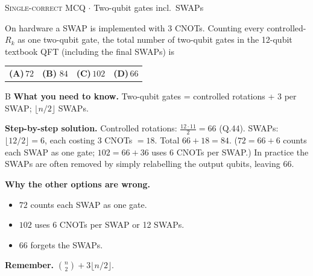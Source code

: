 \documentclass[11pt,a4paper]{article}
\newcommand{\optlabel}[1]{\textbf{(#1)}}
\newcommand{\correctlabel}[1]{\textcolor{okgreen}{\textbf{(#1)}\,\ding{51}}}
\newenvironment{qitem}[1]{\begin{list}{}{\setlength{\leftmargin}{3.3em}\setlength{\labelwidth}{3.1em}%
  \setlength{\labelsep}{0.2em}\setlength{\topsep}{3pt}\setlength{\parsep}{3pt}}\item[\textbf{Q.#1}\hfill]}{\end{list}}
\newcommand{\qsep}{\par\vspace{2pt}{\color{black!15}\hrule}\vspace{4pt}}
\newcommand{\qmeta}[2]{{\footnotesize\color{black!60}\textsc{#1} \;$\cdot$\; #2}\par}
\begin{document}
\begin{qitem}{45}
\qmeta{Single-correct MCQ}{Two-qubit gates incl.\ SWAPs}
On hardware a SWAP is implemented with 3 CNOTs. Counting every controlled-$R_k$ as one two-qubit gate, the total number
of two-qubit gates in the 12-qubit textbook QFT (including the final SWAPs) is
\par\smallskip\noindent\begin{tabularx}{\linewidth}{@{}*{4}{L}@{}}
\optlabel{A}\,$72$ & \correctlabel{B}\,$84$ & \optlabel{C}\,$102$ & \optlabel{D}\,$66$
\end{tabularx}
\end{qitem}
\begin{solbox}{B}
\textbf{\color{brand}What you need to know.} Two-qubit gates = controlled rotations + 3 per SWAP; $\lfloor n/2\rfloor$ SWAPs.

\textbf{\color{brand}Step-by-step solution.} Controlled rotations: $\frac{12\cdot11}{2} = 66$ (Q.44). SWAPs: $\lfloor 12/2\rfloor = 6$, each costing 3 CNOTs $= 18$.
Total $66 + 18 = 84$. ($72 = 66 + 6$ counts each SWAP as one gate; $102 = 66 + 36$ uses 6 CNOTs per SWAP.)
In practice the SWAPs are often removed by simply relabelling the output qubits, leaving 66.

\textbf{\color{brand}Why the other options are wrong.}
\begin{itemize}[leftmargin=2.4em, itemsep=1pt, topsep=2pt]
\item[\textbf{(A)}] $72$ counts each SWAP as one gate.
\item[\textbf{(C)}] $102$ uses 6 CNOTs per SWAP or 12 SWAPs.
\item[\textbf{(D)}] $66$ forgets the SWAPs.
\end{itemize}
\textbf{\color{brand}Remember.} $\binom n2 + 3\lfloor n/2\rfloor$.
\end{solbox}
\qsep
\end{document}
